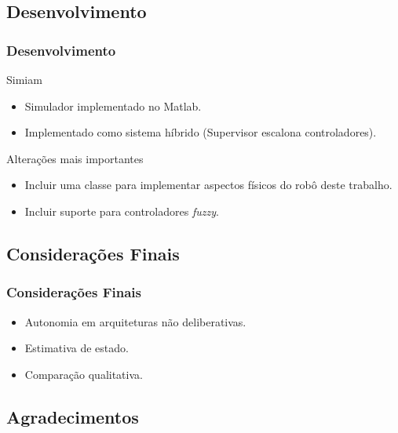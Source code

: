 \documentclass[hyperref={pdfpagelabels=false},table]{beamer}
\begin{document}
\subsection{Desenvolvimento}
\begin{frame}
	\frametitle{Desenvolvimento}
	
	\begin{block}{Simiam}
		\begin{itemize}
		  \item Simulador implementado no Matlab.
		  \item Implementado como sistema híbrido (Supervisor escalona controladores).
		\end{itemize}
	\end{block}
	\pause
	\vspace{-0.15cm}
	
\end{frame}

\begin{frame}
	\begin{exampleblock}{Alterações mais importantes}
		\begin{itemize}
		  \item Incluir uma classe para implementar aspectos físicos do robô deste
		  trabalho.
		  \item Incluir suporte para controladores \textit{fuzzy}.
		\end{itemize}
	\end{exampleblock}
\end{frame}

\subsection{Considerações Finais}
\begin{frame}
	\frametitle{Considerações Finais}
	
	\begin{block}{}
		\begin{itemize}
		  \item Autonomia em arquiteturas não deliberativas.
		  \item Estimativa de estado.
		  \item Comparação qualitativa.
		\end{itemize}
	\end{block}
\end{frame}

\subsection{Agradecimentos}
\begin{frame}
	\titlepage
\end{frame}
\end{document}
